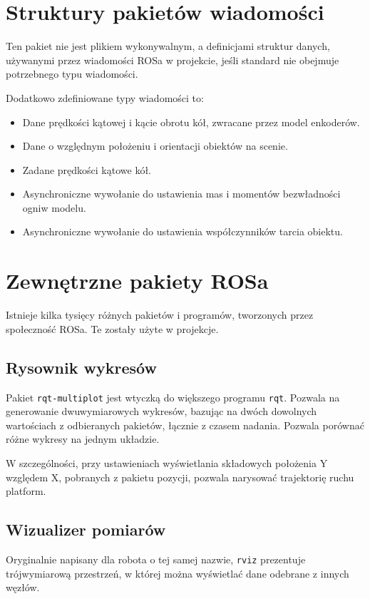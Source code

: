\section{Struktury pakietów wiadomości}
	Ten pakiet nie jest plikiem wykonywalnym, a definicjami struktur danych, używanymi przez wiadomości ROSa w projekcie, jeśli 
	standard nie obejmuje potrzebnego typu wiadomości.
	
	Dodatkowo zdefiniowane typy wiadomości to:
	\begin{itemize}
		\item Dane prędkości kątowej i kącie obrotu kół, zwracane przez model enkoderów.
		\item Dane o względnym położeniu i orientacji obiektów na scenie.
		\item Zadane prędkości kątowe kół.
		\item Asynchroniczne wywołanie do ustawienia mas i momentów bezwładności ogniw modelu.
		\item Asynchroniczne wywołanie do ustawienia współczynników tarcia obiektu.
	\end{itemize}

\section{Zewnętrzne pakiety ROSa}
	Istnieje kilka tysięcy różnych pakietów i programów, tworzonych przez społeczność ROSa.
	Te zostały użyte w projekcje.
	
	\subsection{Rysownik wykresów}
		Pakiet \texttt{rqt-multiplot} jest wtyczką do większego programu \texttt{rqt}.
		Pozwala na generowanie dwuwymiarowych wykresów, bazując na dwóch dowolnych wartościach z odbieranych pakietów, łącznie z czasem nadania.
		Pozwala porównać różne wykresy na jednym układzie.
		
		W szczególności, przy ustawieniach wyświetlania składowych położenia Y względem X, pobranych z pakietu pozycji, pozwala narysować trajektorię ruchu platform.
		
	\subsection{Wizualizer pomiarów}
		Oryginalnie napisany dla robota o tej samej nazwie, \texttt{rviz} prezentuje trójwymiarową przestrzeń, w której można wyświetlać 
		dane odebrane z innych węzłów.
		
